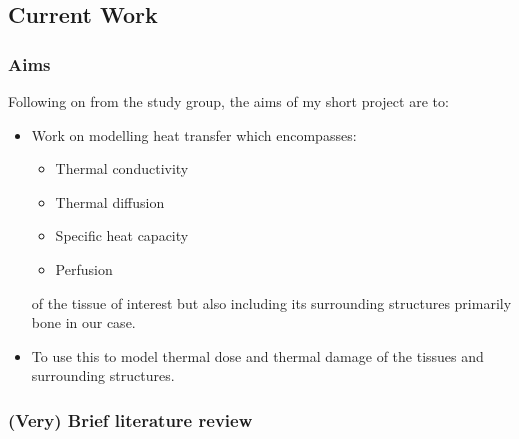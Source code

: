 \documentclass[11pt]{article} %
\begin{document}
\subsection{Current Work } 
 \subsubsection{Aims}   
  Following on from the study group, the aims of my short project are to: 
 \begin{itemize}
 	\item  Work on modelling heat transfer which encompasses: 
 	\begin{itemize}
 		\item  Thermal conductivity
 		\item  Thermal diffusion 
 		\item  Specific heat capacity
 		\item  Perfusion 
 	\end{itemize}
 	of the tissue of interest but also including its surrounding structures primarily bone in our case.
 	
 	\item To use this  to model thermal dose and thermal damage of the tissues and surrounding structures. 
 \end{itemize}

\subsubsection{(Very) Brief literature review}
\end{document}
